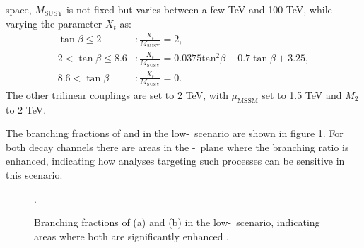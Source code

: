 space, 
$M_{\text{SUSY}}$ is not fixed but varies between a few TeV and 100 TeV, while
varying the parameter $X_t$ as:
\begin{equation}
\begin{split}
\tan{\beta} \leq 2 &: \frac{X_t}{M_{\text{SUSY}}} = 2,\\
2 < \tan{\beta} \leq 8.6 &: \frac{X_t}{M_{\text{SUSY}}} = 0.0375\text{tan}^2\beta - 0.7\tan{\beta} + 3.25,\\
8.6 < \tan{\beta} &: \frac{X_t}{M_{\text{SUSY}}} = 0.
\end{split}
\end{equation}
The other trilinear couplings are set to 2 TeV, with $\mu_{\text{MSSM}}$ set to 1.5 TeV and $M_2$ to 2 TeV.

The branching fractions of \Htohh and \AtoZh in the low-\tanb~scenario are shown in
figure \ref{fig:lowtbhigh_br}. For both decay channels there are areas in the \mA-\tanb~plane
where the branching ratio is enhanced, indicating how analyses targeting such processes 
can be sensitive in this scenario. %

\begin{figure}[h!]
\begin{center}
\end{center}
\caption[Branching fractions of \Htohh and \AtoZh in the low-\tanb~scenario.]{Branching fractions of (a) \Htohh and (b) \AtoZh in the low-\tanb~scenario, indicating 
areas where both are significantly enhanced \cite{MSSM-lowtanb}.}
\label{fig:lowtbhigh_br}.
\end{figure}

